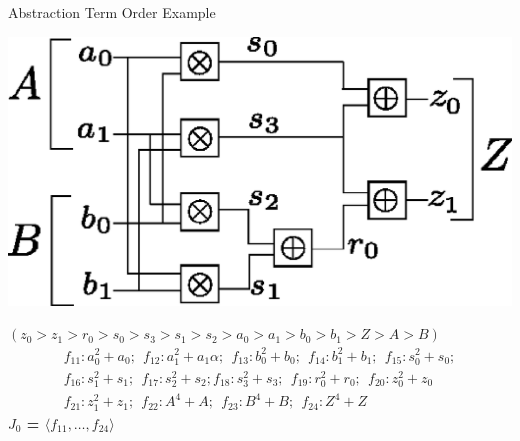 \documentclass[xcolor=dvipsnames]{beamer}
\begin{document}

\begin{frame}{\large{Abstraction Term Order Example}}

\centerline{
\includegraphics[scale=0.4]{2bitmult.eps}
}
{\bf $(z_0 > z_1 > r_0 > s_0 > s_3 > s_1 > s_2 > a_0 > a_1 >  b_0 > b_1 > Z > A > B)$}
\begin{align*}
f_{11}: a_0^2+a_0; ~~f_{12}: a_1^2+a_1 \alpha; ~~f_{13}: b_0^2+b_0; ~~f_{14}: b_1^2+b_1; ~~f_{15}: s_0^2+s_0;  \nonumber \\
f_{16}: s_1^2+s_1; ~~f_{17}: s_2^2+s_2; f_{18}: s_3^2+s_3; ~~f_{19}: r_0^2+r_0; ~~f_{20}: z_0^2+z_0 \nonumber \\
f_{21}: z_1^2+z_1; ~~f_{22}: A^4+A; ~~f_{23}: B^4+B; ~~f_{24}:Z^4+Z \nonumber
\end{align*}
\vspace{-0.3in}
{\bf $J_0$ = $\langle f_{11}, \dots, f_{24} \rangle$}
\end{frame}

\end{document}
